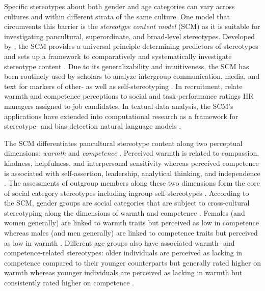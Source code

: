 \documentclass[man]{apa7}
\begin{document}
Specific stereotypes about both gender and age categories can vary across cultures and within different strata of the same culture. One model that circumvents this barrier is the \textit{stereotype content model} (SCM) as it is suitable for investigating pancultural, superordinate, and broad-level stereotypes. Developed by \Textcite{fiske_model_2002}, the SCM provides a universal principle determining predictors of stereotypes and sets up a framework to comparatively and systematically investigate stereotype content \parencite{kroon_reliable_2018, van_selm_search_2021}. Due to its generalizability and intuitiveness, the SCM has been routinely used by scholars to analyze intergroup communication, media, and text for markers of other- as well as self-stereotyping \parencite{westerhof_filling_2010, white_think_2009}. In recruitment, \Textcite{hofhuis_dealing_2016} relate warmth and competence perceptions to social and task-performance ratings HR managers assigned to job candidates. In textual data analysis, the SCM’s applications have extended into computational research as a framework for stereotype- and bias-detection natural language models \parencite{nicolas2020ComprehensiveStereotypeContent}.

The SCM differentiates pancultural stereotype content along two perceptual dimensions: \textit{warmth} and \textit{competence} \parencite{cuddy_stereotype_2009}. Perceived warmth is related to compassion, kindness, helpfulness, and interpersonal sensitivity whereas perceived competence is associated with self-assertion, leadership, analytical thinking, and independence \parencite[]{bruckmuller_density_2013, Carli2016, hummert_multiple_1990}. The assessments of outgroup members along these two dimensions form the core of social category stereotypes including ingroup self-stereotypes \parencite{hinton_exploring_2019}. According to the SCM, gender groups are social categories that are subject to cross-cultural stereotyping along the dimensions of warmth and competence \parencite{fiske_model_2002}. Females (and women generally) are linked to warmth traits but perceived as low in competence whereas males (and men generally) are linked to competence traits but perceived as low in warmth \parencite{Eagly1997, suh_gender_2004}. Different age groups also have associated warmth- and competence-related stereotypes: older individuals are perceived as lacking in competence compared to their younger counterparts but generally rated higher on warmth whereas younger individuals are perceived as lacking in warmth but consistently rated higher on competence \parencite{cuddy_this_2005, van_selm_search_2021}.
\end{document}

